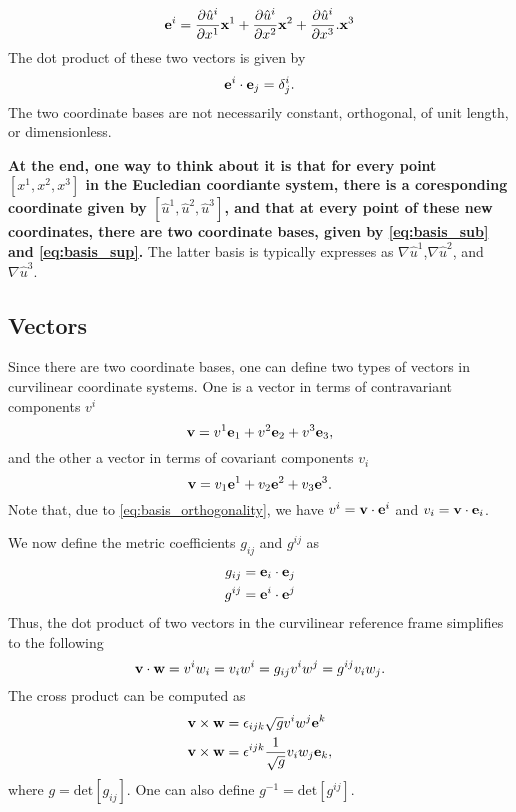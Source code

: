 \documentclass[11pt]{article}
\newcommand{\uhat}{\hat{u}}
\begin{document}
\begin{equation}
\label{eq:basis_sup}
    \evec^i = \frac{ \partial \uhat^i}{\partial x^1} \xvec^1 + \frac{ \partial \uhat^i}{\partial x^2} \xvec^2 + \frac{ \partial \uhat^i}{\partial x^3}. \xvec^3
\end{equation}
The dot product of these two vectors is given by
\begin{equation}
\label{eq:basis_orthogonality}
    \mathbf{e}^i \cdot \mathbf{e}_j = \delta^i_j.
\end{equation}
The two coordinate bases are not necessarily constant, orthogonal, of unit length, or dimensionless.

\textbf{At the end, one way to think about it is that for every point $[x^1,x^2,x^3]$ in the Eucledian coordiante system, there is a coresponding coordinate given by $[\uhat^1,\uhat^2,\uhat^3]$, and that at every point of these new coordinates, there are two coordinate bases, given by \cref{eq:basis_sub} and \cref{eq:basis_sup}.} The latter basis is typically expresses as $\nabla \uhat^1$,$\nabla \uhat^2$, and $\nabla \uhat^3$.

\subsection{Vectors}
Since there are two coordinate bases, one can define two types of vectors in curvilinear coordinate systems. One is a vector in terms of contravariant components $v^i$ 
\begin{equation}
    \mathbf{v} = v^1 \mathbf{e}_1 + v^2 \mathbf{e}_2 + v^3 \mathbf{e}_3,
\end{equation}
and the other a vector in terms of covariant components $v_i$
\begin{equation}
    \mathbf{v} = v_1 \mathbf{e}^1 + v_2 \mathbf{e}^2 + v_3 \mathbf{e}^3.
\end{equation}
Note that, due to \cref{eq:basis_orthogonality}, we have $v^i = \mathbf{v} \cdot \mathbf{e}^i$ and $v_i = \mathbf{v} \cdot \mathbf{e}_i$.

We now define the metric coefficients $g_{ij}$ and $g^{ij}$ as
\begin{align}
    g_{ij} &= \mathbf{e}_i \cdot \mathbf{e}_j \\
    g^{ij} &= \mathbf{e}^i \cdot \mathbf{e}^j \\
\end{align}
Thus, the dot product of two vectors in the curvilinear reference frame simplifies to the following
\begin{equation}
\mathbf{v} \cdot \mathbf{w} = v^i w_i = v_i w^i = g_{ij} v^i w^j = g^{ij} v_i w_j.
\end{equation}
The cross product can be computed as
\begin{align}
    \mathbf{v} \times \mathbf{w} &= \epsilon_{ijk} \sqrt{g} v^i w^j \mathbf{e}^k \\
    \mathbf{v} \times \mathbf{w} &= \epsilon^{ijk} \frac{1}{\sqrt{g}} v_i w_j \mathbf{e}_k,
\end{align}
where $g = \text{det}[ g_{ij} ]$. One can also define $g^{-1} = \text{det}[ g^{ij} ]$.
\end{document}
